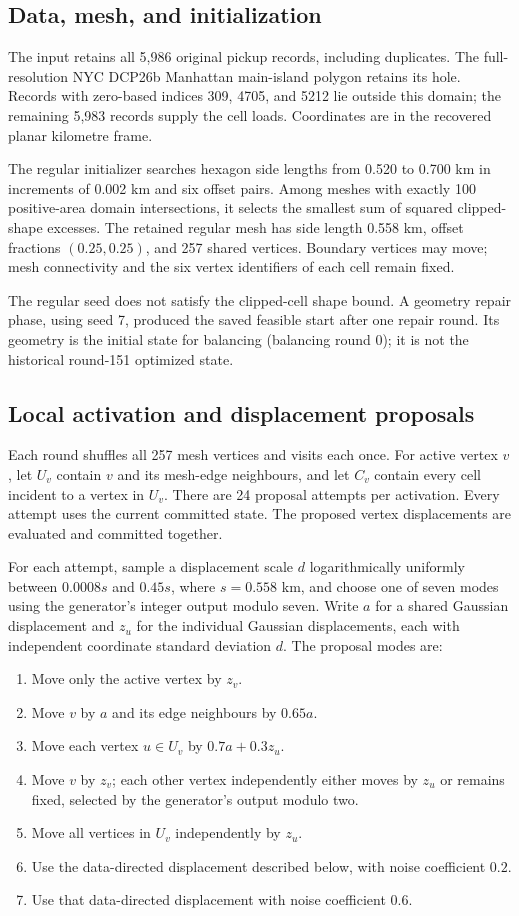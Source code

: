 \documentclass[11pt]{article}
\begin{document}
\subsection{Data, mesh, and initialization}
The input retains all 5,986 original pickup records, including duplicates.
The full-resolution NYC DCP26b Manhattan main-island polygon retains its hole.
Records with zero-based indices 309, 4705, and 5212 lie outside this domain;
the remaining 5,983 records supply the cell loads. Coordinates are in the
recovered planar kilometre frame.

The regular initializer searches hexagon side lengths from 0.520 to 0.700 km
in increments of 0.002 km and six offset pairs. Among meshes with exactly
100 positive-area domain intersections, it selects the smallest sum of
squared clipped-shape excesses. The retained regular mesh has side length
0.558 km, offset fractions $(0.25,0.25)$, and 257 shared vertices.
Boundary vertices may move; mesh connectivity and the six vertex identifiers
of each cell remain fixed.

The regular seed does not satisfy the clipped-cell shape bound. A geometry
repair phase, using seed 7, produced the saved feasible start after one
repair round. Its geometry is the initial state for balancing (balancing
round 0); it is not the historical round-151 optimized state.

\subsection{Local activation and displacement proposals}
Each round shuffles all 257 mesh vertices and visits each once. For active
vertex $v$, let $U_v$ contain $v$ and its mesh-edge neighbours, and let $C_v$
contain every cell incident to a vertex in $U_v$. There are 24 proposal
attempts per activation. Every attempt uses the current committed state.
The proposed vertex displacements are evaluated and committed together.

For each attempt, sample a displacement scale $d$ logarithmically uniformly
between $0.0008s$ and $0.45s$, where $s=0.558$ km, and choose one of seven
modes using the generator's integer output modulo seven. Write $a$ for a
shared Gaussian displacement and $z_u$ for the individual Gaussian
displacements, each with independent coordinate standard deviation $d$.
The proposal modes are:
\begin{enumerate}
\item Move only the active vertex by $z_v$.
\item Move $v$ by $a$ and its edge neighbours by $0.65a$.
\item Move each vertex $u\in U_v$ by $0.7a+0.3z_u$.
\item Move $v$ by $z_v$; each other vertex independently either moves by
      $z_u$ or remains fixed, selected by the generator's output modulo two.
\item Move all vertices in $U_v$ independently by $z_u$.
\item Use the data-directed displacement described below, with noise
      coefficient $0.2$.
\item Use that data-directed displacement with noise coefficient $0.6$.
\end{enumerate}
\end{document}
